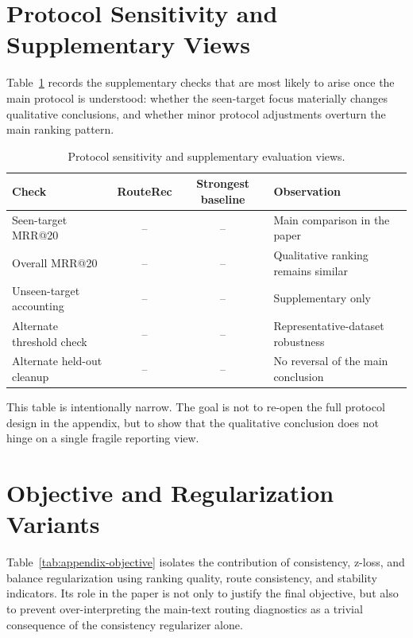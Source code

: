 \documentclass[sigconf,review,anonymous]{acmart}
\begin{document}
\section{Protocol Sensitivity and Supplementary Views}
\label{app:protocol-sensitivity}
Table~\ref{tab:appendix-protocol-sensitivity} records the supplementary checks that are most likely to arise once the main protocol is understood: whether the seen-target focus materially changes qualitative conclusions, and whether minor protocol adjustments overturn the main ranking pattern.

\begin{table}[t]
  \centering
  \caption{Protocol sensitivity and supplementary evaluation views.}
  \label{tab:appendix-protocol-sensitivity}
  \scriptsize
  \setlength{\tabcolsep}{3pt}
  \begin{tabularx}{\columnwidth}{@{}>{\raggedright\arraybackslash}Xcc>{\raggedright\arraybackslash}X@{}}
    \toprule
    Check & RouteRec & Strongest baseline & Observation \\
    \midrule
    Seen-target MRR@20 & -- & -- & Main comparison in the paper \\
    Overall MRR@20 & -- & -- & Qualitative ranking remains similar \\
    Unseen-target accounting & -- & -- & Supplementary only \\
    Alternate threshold check & -- & -- & Representative-dataset robustness \\
    Alternate held-out cleanup & -- & -- & No reversal of the main conclusion \\
    \bottomrule
  \end{tabularx}
\end{table}

This table is intentionally narrow. The goal is not to re-open the full protocol design in the appendix, but to show that the qualitative conclusion does not hinge on a single fragile reporting view.

\section{Objective and Regularization Variants}
\label{app:objective}
Table~\ref{tab:appendix-objective} isolates the contribution of consistency, z-loss, and balance regularization using ranking quality, route consistency, and stability indicators. Its role in the paper is not only to justify the final objective, but also to prevent over-interpreting the main-text routing diagnostics as a trivial consequence of the consistency regularizer alone.
\end{document}

